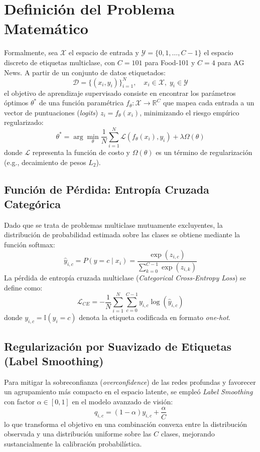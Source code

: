 \documentclass[conference]{IEEEtran}
\begin{document}
\section{Definición del Problema Matemático}
Formalmente, sea $\mathcal{X}$ el espacio de entrada y $\mathcal{Y} = \{0, 1, \dots, C-1\}$ el espacio discreto de etiquetas multiclase, con $C=101$ para Food-101 y $C=4$ para AG News. A partir de un conjunto de datos etiquetados:
\begin{equation}
\mathcal{D} = \{(x_i, y_i)\}_{i=1}^N, \quad x_i \in \mathcal{X}, \; y_i \in \mathcal{Y}
\end{equation}
el objetivo de aprendizaje supervisado consiste en encontrar los parámetros óptimos $\theta^*$ de una función paramétrica $f_\theta: \mathcal{X} \to \mathbb{R}^C$ que mapea cada entrada a un vector de puntuaciones (\textit{logits}) $z_i = f_\theta(x_i)$, minimizando el riesgo empírico regularizado:
\begin{equation}
\theta^* = \arg\min_\theta \frac{1}{N} \sum_{i=1}^N \mathcal{L}(f_\theta(x_i), y_i) + \lambda \Omega(\theta)
\end{equation}
donde $\mathcal{L}$ representa la función de costo y $\Omega(\theta)$ es un término de regularización (e.g., decaimiento de pesos $L_2$).

\subsection{Función de Pérdida: Entropía Cruzada Categórica}
Dado que se trata de problemas multiclase mutuamente excluyentes, la distribución de probabilidad estimada sobre las clases se obtiene mediante la función softmax:
\begin{equation}
\hat{y}_{i,c} = P(y = c \mid x_i) = \frac{\exp(z_{i,c})}{\sum_{k=0}^{C-1} \exp(z_{i,k})}
\end{equation}
La pérdida de entropía cruzada multiclase (\textit{Categorical Cross-Entropy Loss}) se define como:
\begin{equation}
\mathcal{L}_{CE} = -\frac{1}{N} \sum_{i=1}^N \sum_{c=0}^{C-1} y_{i,c} \log(\hat{y}_{i,c})
\end{equation}
donde $y_{i,c} = \mathbb{I}(y_i = c)$ denota la etiqueta codificada en formato \textit{one-hot}.

\subsection{Regularización por Suavizado de Etiquetas (Label Smoothing)}
Para mitigar la sobreconfianza (\textit{overconfidence}) de las redes profundas y favorecer un agrupamiento más compacto en el espacio latente, se empleó \textit{Label Smoothing} con factor $\alpha \in [0, 1]$ en el modelo avanzado de visión:
\begin{equation}
q_{i,c} = (1 - \alpha) y_{i,c} + \frac{\alpha}{C}
\end{equation}
lo que transforma el objetivo en una combinación convexa entre la distribución observada y una distribución uniforme sobre las $C$ clases, mejorando sustancialmente la calibración probabilística.
\end{document}
